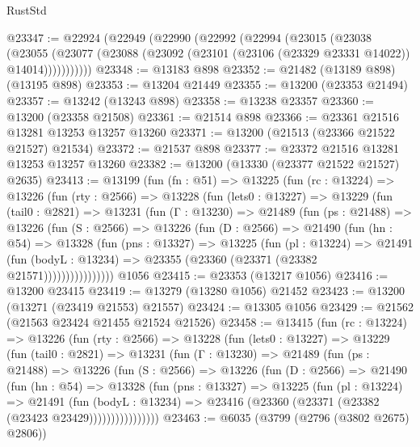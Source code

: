 \begin{lexlean}{RustStd}
\begin{coremodule}
@23347 := @22924
    (@22949
      (@22990
        (@22992
          (@22994
            (@23015
              (@23038
                (@23055
                  (@23077 (@23088 (@23092 (@23101 (@23106 (@23329 @23331 @14022)) @14014)))))))))))
@23348 := @13183 @898
@23352 := @21482 (@13189 @898) (@13195 @898)
@23353 := @13204 @21449
@23355 := @13200 (@23353 @21494)
@23357 := @13242 (@13243 @898)
@23358 := @13238 @23357
@23360 := @13200 (@23358 @21508)
@23361 := @21514 @898
@23366 := @23361 @21516 @13281 @13253 @13257 @13260
@23371 := @13200 (@21513 (@23366 @21522 @21527) @21534)
@23372 := @21537 @898
@23377 := @23372 @21516 @13281 @13253 @13257 @13260
@23382 := @13200 (@13330 (@23377 @21522 @21527) @2635)
@23413 := @13199
    (fun (fn : @51) =>
    @13225
      (fun (rc : @13224) =>
      @13226
        (fun (rty : @2566) =>
        @13228
          (fun (lets0 : @13227) =>
          @13229
            (fun (tail0 : @2821) =>
            @13231
              (fun (Γ : @13230) =>
              @21489
                (fun (ps : @21488) =>
                @13226
                  (fun (S : @2566) =>
                  @13226
                    (fun (D : @2566) =>
                    @21490
                      (fun (hn : @54) =>
                      @13328
                        (fun (pns : @13327) =>
                        @13225
                          (fun (pl : @13224) =>
                          @21491
                            (fun (bodyL : @13234) =>
                            @23355 (@23360 (@23371 (@23382 @21571))))))))))))))))
    @1056
@23415 := @23353 (@13217 @1056)
@23416 := @13200 @23415
@23419 := @13279 (@13280 @1056) @21452
@23423 := @13200 (@13271 (@23419 @21553) @21557)
@23424 := @13305 @1056
@23429 := @21562 (@21563 @23424 @21455 @21524 @21526)
@23458 := @13415
    (fun (rc : @13224) =>
    @13226
      (fun (rty : @2566) =>
      @13228
        (fun (lets0 : @13227) =>
        @13229
          (fun (tail0 : @2821) =>
          @13231
            (fun (Γ : @13230) =>
            @21489
              (fun (ps : @21488) =>
              @13226
                (fun (S : @2566) =>
                @13226
                  (fun (D : @2566) =>
                  @21490
                    (fun (hn : @54) =>
                    @13328
                      (fun (pns : @13327) =>
                      @13225
                        (fun (pl : @13224) =>
                        @21491
                          (fun (bodyL : @13234) =>
                          @23416 (@23360 (@23371 (@23382 (@23423 @23429))))))))))))))))
@23463 := @6035 (@3799 (@2796 (@3802 @2675) @2806))

\end{coremodule}
\end{lexlean}
